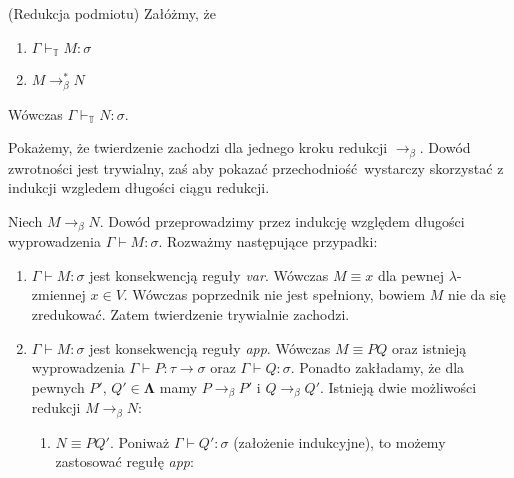 \begin{lemat}(Redukcja podmiotu)\label{thm:subject_reduction}
    Załóżmy, że
    \begin{enumerate}[label=(\roman*)]
      \setlength\itemsep{0em}
      \item \(\Gamma\vdash_\mathbb{T} M:\sigma\) 
      \item \(M\to^{*}_\beta N\)
    \end{enumerate}
    Wówczas \(\Gamma\vdash_\mathbb{T}N:\sigma\).
\end{lemat}
\begin{dowod}
  Pokażemy, że twierdzenie zachodzi dla jednego kroku redukcji \(\to_\beta\). Dowód zwrotności jest trywialny, zaś aby pokazać przechodniość wystarczy skorzystać z indukcji wzgledem długości ciągu redukcji.

  Niech \(M\to_\beta N\). Dowód przeprowadzimy przez indukcję względem długości wyprowadzenia \(\Gamma\vdash M:\sigma\). Rozważmy następujące przypadki:
  \begin{enumerate}[label=(\alph*)]
    \setlength\itemsep{0em}
    \item    \(\Gamma\vdash     M:\sigma\)    jest    konsekwencją
    reguły   \emph{var}.  Wówczas   \(M\equiv   x\)  dla   pewnej
    \(\lambda\)-zmiennej  \(x\in   V\).  Wówczas   poprzednik  nie
    jest  spełniony,   bowiem  \(M\)  nie  da   się  zredukować.
    Zatem  twierdzenie  trywialnie zachodzi.  
  
    \item  \(\Gamma\vdash  M:\sigma\)  jest  konsekwencją  reguły
    \emph{app}.    Wówczas   \(M\equiv    PQ\)   oraz    istnieją
    wyprowadzenia  \(\Gamma\vdash   P:\tau\to\sigma\)  oraz  \(\Gamma
    \vdash   Q:\sigma\).   Ponadto   zakładamy,  że   dla   pewnych
    \(P',\,Q'\in\mathbf{\Lambda}\)   mamy   \(P\to_\beta   P'\)   i
    \(Q\to_\beta   Q'\).  Istnieją   dwie  możliwości   redukcji
    \(M\to_\beta N\):
      \begin{enumerate}[label=(\arabic*)]
        \setlength\itemsep{0em}
        \item \(N\equiv PQ'\). Poniważ \(\Gamma\vdash Q':\sigma\) (założenie indukcyjne), to możemy zastosować regułę \emph{app}:


\end{enumerate}
\end{enumerate}
\end{dowod}
